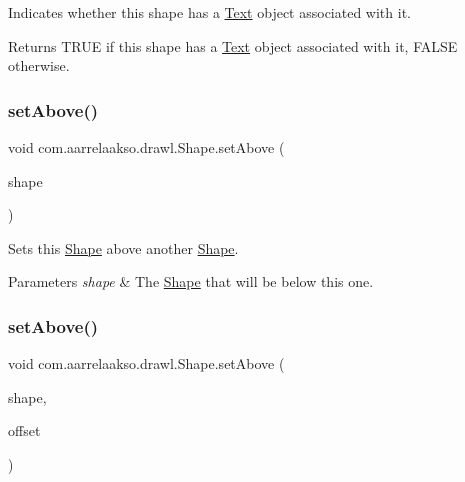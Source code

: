 Indicates whether this shape has a \hyperlink{classcom_1_1aarrelaakso_1_1drawl_1_1_text}{Text} object associated with it. 

\begin{DoxyReturn}{Returns}
T\+R\+UE if this shape has a \hyperlink{classcom_1_1aarrelaakso_1_1drawl_1_1_text}{Text} object associated with it, F\+A\+L\+SE otherwise. 
\end{DoxyReturn}
\mbox{\label{classcom_1_1aarrelaakso_1_1drawl_1_1_shape_a4deb22d64fef2115a0bc4802e8dba682}} 
\subsubsection{\texorpdfstring{set\+Above()}{setAbove()}\hspace{0.1cm}{\footnotesize\ttfamily [1/2]}}
{\footnotesize\ttfamily void com.\+aarrelaakso.\+drawl.\+Shape.\+set\+Above (\begin{DoxyParamCaption}\item[{@Not\+Null final \hyperlink{classcom_1_1aarrelaakso_1_1drawl_1_1_shape}{Shape}}]{shape }\end{DoxyParamCaption})}



Sets this \hyperlink{classcom_1_1aarrelaakso_1_1drawl_1_1_shape}{Shape} above another \hyperlink{classcom_1_1aarrelaakso_1_1drawl_1_1_shape}{Shape}. 


\begin{DoxyParams}{Parameters}
{\em shape} & The \hyperlink{classcom_1_1aarrelaakso_1_1drawl_1_1_shape}{Shape} that will be below this one. \\
\hline
\end{DoxyParams}
\mbox{\label{classcom_1_1aarrelaakso_1_1drawl_1_1_shape_aad0b2fb173c0112b71b06cf90709acc3}} 
\subsubsection{\texorpdfstring{set\+Above()}{setAbove()}\hspace{0.1cm}{\footnotesize\ttfamily [2/2]}}
{\footnotesize\ttfamily void com.\+aarrelaakso.\+drawl.\+Shape.\+set\+Above (\begin{DoxyParamCaption}\item[{@Not\+Null final \hyperlink{classcom_1_1aarrelaakso_1_1drawl_1_1_shape}{Shape}}]{shape,  }\item[{@Not\+Null final \hyperlink{classcom_1_1aarrelaakso_1_1drawl_1_1_measure}{Measure}}]{offset }\end{DoxyParamCaption})}




